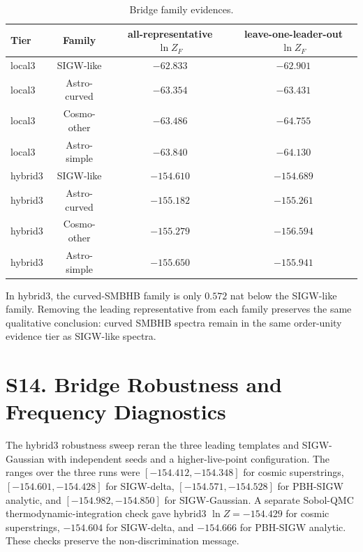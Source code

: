 \documentclass[aps,prl,superscriptaddress,nofootinbib]{revtex4-2}
\begin{document}
\begin{table}[H]
\caption{\label{tab:bridge-family}Bridge family evidences.}
\begin{ruledtabular}
\begin{tabular}{lccc}
Tier & Family & all-representative $\ln Z_F$ & leave-one-leader-out $\ln Z_F$ \\
\hline
local3 & SIGW-like & $-62.833$ & $-62.901$ \\
local3 & Astro-curved & $-63.354$ & $-63.431$ \\
local3 & Cosmo-other & $-63.486$ & $-64.755$ \\
local3 & Astro-simple & $-63.840$ & $-64.130$ \\
hybrid3 & SIGW-like & $-154.610$ & $-154.689$ \\
hybrid3 & Astro-curved & $-155.182$ & $-155.261$ \\
hybrid3 & Cosmo-other & $-155.279$ & $-156.594$ \\
hybrid3 & Astro-simple & $-155.650$ & $-155.941$ \\
\end{tabular}
\end{ruledtabular}
\end{table}

In hybrid3, the curved-SMBHB family is only $0.572$ nat below the SIGW-like
family.  Removing the leading representative from each family preserves the
same qualitative conclusion: curved SMBHB spectra remain in the same
order-unity evidence tier as SIGW-like spectra.

\section*{S14. Bridge Robustness and Frequency Diagnostics}

The hybrid3 robustness sweep reran the three leading templates and
SIGW-Gaussian with independent seeds and a higher-live-point configuration.
The ranges over the three runs were $[-154.412,-154.348]$ for cosmic
superstrings, $[-154.601,-154.428]$ for SIGW-delta,
$[-154.571,-154.528]$ for PBH-SIGW analytic, and
$[-154.982,-154.850]$ for SIGW-Gaussian.  A separate Sobol-QMC
thermodynamic-integration check gave hybrid3 $\ln Z=-154.429$ for cosmic
superstrings, $-154.604$ for SIGW-delta, and $-154.666$ for PBH-SIGW
analytic.  These checks preserve the non-discrimination message.
\end{document}

